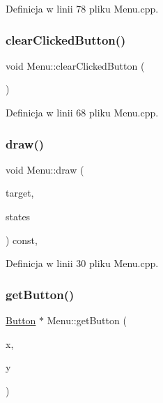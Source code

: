 Definicja w linii 78 pliku Menu.\+cpp.

\mbox{\label{class_menu_a6ebff4998eb64bad2871a658ab7ed3c0}} 
\subsubsection{\texorpdfstring{clear\+Clicked\+Button()}{clearClickedButton()}}
{\footnotesize\ttfamily void Menu\+::clear\+Clicked\+Button (\begin{DoxyParamCaption}{ }\end{DoxyParamCaption})}



Definicja w linii 68 pliku Menu.\+cpp.

\mbox{\label{class_menu_a0a6873f5c605195a1f242c3f678df55e}} 
\subsubsection{\texorpdfstring{draw()}{draw()}}
{\footnotesize\ttfamily void Menu\+::draw (\begin{DoxyParamCaption}\item[{sf\+::\+Render\+Target \&}]{target,  }\item[{sf\+::\+Render\+States}]{states }\end{DoxyParamCaption}) const\hspace{0.3cm}{\ttfamily [override]}, {\ttfamily [protected]}}



Definicja w linii 30 pliku Menu.\+cpp.

\mbox{\label{class_menu_add20f283775e3cdb3ad8e8f8f02af83e}} 
\subsubsection{\texorpdfstring{get\+Button()}{getButton()}}
{\footnotesize\ttfamily \mbox{\hyperlink{class_button}{Button}} $\ast$ Menu\+::get\+Button (\begin{DoxyParamCaption}\item[{float}]{x,  }\item[{float}]{y }\end{DoxyParamCaption})}



